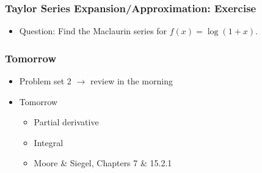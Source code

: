 \documentclass[pdflatex, 12pt]{beamer}
\begin{document}
\begin{frame}
\frametitle{Taylor Series Expansion/Approximation: Exercise}
\begin{itemize}
\item Question: Find the Maclaurin series for $f(x) = \log(1 + x)$.
\end{itemize}
\end{frame}

\begin{frame}
\frametitle{Tomorrow}
\begin{itemize}
\item Problem set 2 $\rightarrow$ review in the morning
\vspace{0.4cm}
\item Tomorrow
 \begin{itemize}
 \item Partial derivative
 \item Integral
 \item Moore \& Siegel, Chapters 7 \& 15.2.1
 \end{itemize}
\end{itemize}
\end{frame}
\end{document}

